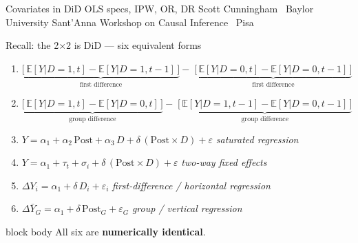 \documentclass[aspectratio=169,11pt]{beamer}
\newcommand{\emphbox}[1]{%
  \begin{beamercolorbox}[rounded=true,sep=7pt,wd=\linewidth]{block body}%
    \small\color{slate} #1%
  \end{beamercolorbox}}
\begin{document}
\codechellatitle
  {Covariates in DiD}
  {OLS specs, IPW, OR, DR}
  {Scott Cunningham \textperiodcentered\ Baylor University}
  {Sant'Anna Workshop on Causal Inference \textperiodcentered\ Pisa}


\begin{frame}{Recall: the 2$\times$2 is DiD --- six equivalent forms}
\vspace{0.2em}
{\footnotesize
\begin{enumerate}\setlength\itemsep{0.25em}

  \item $\underbrace{\bigl[\,\mathbb{E}[Y|D{=}1,t]
         - \mathbb{E}[Y|D{=}1,t{-}1]\,\bigr]}_{\text{first difference}}
        -\;
        \underbrace{\bigl[\,\mathbb{E}[Y|D{=}0,t]
         - \mathbb{E}[Y|D{=}0,t{-}1]\,\bigr]}_{\text{first difference}}$

  \item $\underbrace{\bigl[\,\mathbb{E}[Y|D{=}1,t]
         - \mathbb{E}[Y|D{=}0,t]\,\bigr]}_{\text{group difference}}
        -\;
        \underbrace{\bigl[\,\mathbb{E}[Y|D{=}1,t{-}1]
         - \mathbb{E}[Y|D{=}0,t{-}1]\,\bigr]}_{\text{group difference}}$

  \item $Y = \alpha_1 + \alpha_2\,\mathrm{Post} + \alpha_3\,D
         + \delta\,(\mathrm{Post}\times D) + \varepsilon$
        \hfill{\color{warmgray}\itshape saturated regression}

  \item $Y = \alpha_1 + \tau_t + \sigma_i
         + \delta\,(\mathrm{Post}\times D) + \varepsilon$
        \hfill{\color{warmgray}\itshape two-way fixed effects}

  \item $\Delta Y_i = \alpha_1 + \delta\,D_i + \varepsilon_i$
        \hfill{\color{warmgray}\itshape first-difference / horizontal regression}

  \item $\Delta\bar{Y}_G = \alpha_1 + \delta\,\mathrm{Post}_G + \varepsilon_G$
        \hfill{\color{warmgray}\itshape group / vertical regression}

\end{enumerate}
}
\vspace{0.3em}
\emphbox{All six are \textbf{numerically identical}.}
\end{frame}
\end{document}
